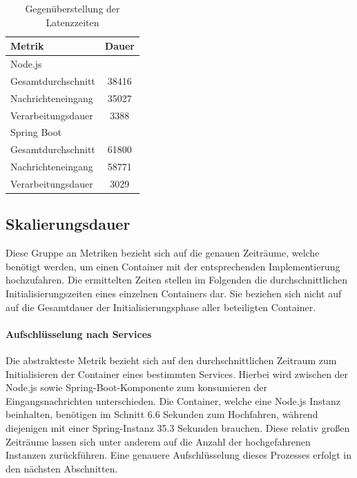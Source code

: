 \begin{table}[ht!]
	\centering
	\caption[Latenzzeit - Vergleich]{Gegenüberstellung der Latenzzeiten}
  \label{tab:latency}
  \hspace{5mm}
  \begin{tabular}{@{}lc@{}}
    \toprule
    Metrik & Dauer \\
    \midrule
    Node.js \\
    \hspace{3mm}Gesamtdurchschnitt & 38416 \\
    \hspace{3mm}Nachrichteneingang & 35027 \\
    \hspace{3mm}Verarbeitungsdauer & 3388 \\
    \midrule
    Spring Boot \\
    \hspace{3mm}Gesamtdurchschnitt & 61800 \\
    \hspace{3mm}Nachrichteneingang & 58771 \\
    \hspace{3mm}Verarbeitungsdauer & 3029 \\
    \bottomrule
  \end{tabular}
\end{table}


\subsection{Skalierungsdauer}
Diese Gruppe an Metriken bezieht sich auf die genauen Zeiträume, welche benötigt werden, um einen Container mit der entsprechenden Implementierung hochzufahren. Die ermittelten Zeiten stellen im Folgenden die durchschnittlichen Initialisierungszeiten eines einzelnen Containers dar. Sie beziehen sich nicht auf auf die Gesamtdauer der Initialisierungsphase aller beteiligten Container.

\paragraph{Aufschlüsselung nach Services}
Die abstrakteste Metrik bezieht sich auf den durchschnittlichen Zeitraum zum Initialisieren der Container eines bestimmten Services. Hierbei wird zwischen der Node.js sowie Spring-Boot-Komponente zum konsumieren der Eingangsnachrichten unterschieden. Die Container, welche eine Node.js Instanz beinhalten, benötigen im Schnitt 6.6 Sekunden zum Hochfahren, während diejenigen mit einer Spring-Instanz 35.3 Sekunden brauchen. Diese relativ großen Zeiträume lassen sich unter anderem auf die Anzahl der hochgefahrenen Instanzen zurückführen. Eine genauere Aufschlüsselung dieses Prozesses erfolgt in den nächsten Abschnitten. 

